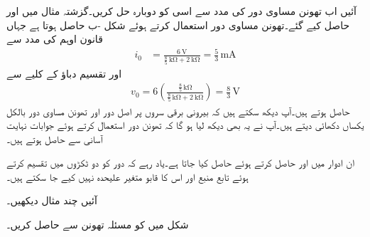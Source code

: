 آئیں اب تھونن مساوی دور کی مدد سے اسی کو دوبارہ حل کریں۔گزشتہ مثال میں  اور  حاصل کیے گئے۔تھونن مساوی دور استعمال کرتے ہوئے شکل -ب حاصل ہوتا ہے جہاں قانون اوہم کی مدد سے
\begin{align*}
i_0&=\frac{\SI{6}{\volt}}{\frac{8}{5} \, \si{\kilo\ohm}+\SI{2}{\kilo\ohm}}=\frac{5}{3}\,\si{\milli\ampere}
\end{align*}
اور تقسیم دباؤ کے کلیے سے
\begin{align*}
v_0=6\left(\frac{\frac{8}{5}\,\si{\kilo\ohm}}{\frac{8}{5}\,\si{\kilo\ohm}+\SI{2}{\kilo\ohm}}\right)=\frac{8}{3} \, \si{\volt}
\end{align*}
حاصل ہوتے ہیں۔آپ دیکھ سکتے ہیں کہ بیرونی برقی سروں پر اصل دور اور تھونن مساوی دور بالکل یکساں دکھائی دیتے ہیں۔آپ نے یہ بھی دیکھ لیا ہو گا کہ تھونن دور استعمال کرتے ہوئے جوابات نہایت آسانی سے حاصل ہوتے ہیں۔

ان ادوار میں  اور  حاصل کرتے ہوئے  حاصل کیا جاتا ہے۔یاد رہے کہ دور کو دو ٹکڑوں میں تقسیم کرتے ہوئے تابع منبع اور اس کا قابو متغیر علیحدہ نہیں کیے جا سکتے ہیں۔

آئیں چند مثال دیکھیں۔

شکل  میں  کو  مسئلہ تھونن سے حاصل کریں۔

